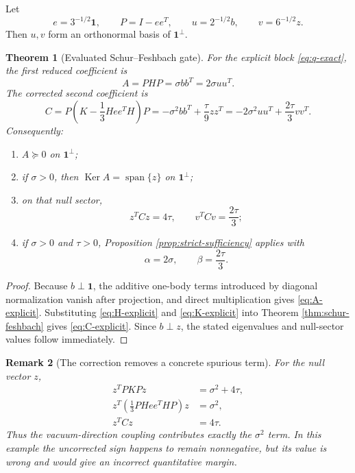\documentclass[11pt]{article}
\newtheorem{theorem}{Theorem}[section]
\newtheorem{remark}[theorem]{Remark}
\newcommand{\one}{\mathbf 1}
\newcommand{\Span}{\operatorname{span}}
\newcommand{\Ker}{\operatorname{Ker}}
\begin{document}
Let
\begin{equation}
  e=3^{-1/2}\one,
  \qquad
  P=I-ee^T,
  \qquad
  u=2^{-1/2}b,
  \qquad
  v=6^{-1/2}z.
  \label{eq:u-v}
\end{equation}
Then $u,v$ form an orthonormal basis of $\one^\perp$.

\begin{theorem}[Evaluated Schur--Feshbach gate]
\label{thm:evaluated-gate}
For the explicit block \eqref{eq:q-exact}, the first reduced coefficient is
\begin{equation}
  A=PHP=\sigma bb^T=2\sigma uu^T.
  \label{eq:A-explicit}
\end{equation}
The corrected second coefficient is
\begin{equation}
  C=P\left(K-\frac13Hee^TH\right)P
  =-\sigma^2bb^T+\frac{\tau}{9}zz^T
  =-2\sigma^2uu^T+\frac{2\tau}{3}vv^T.
  \label{eq:C-explicit}
\end{equation}
Consequently:
\begin{enumerate}[label=(\alph*)]
  \item $A\succeq0$ on $\one^\perp$;
  \item if $\sigma>0$, then $\Ker A=\Span\{z\}$ on $\one^\perp$;
  \item on that null sector,
  \begin{equation}
    z^TCz=4\tau,
    \qquad
    v^TCv=\frac{2\tau}{3};
    \label{eq:null-margin}
  \end{equation}
  \item if $\sigma>0$ and $\tau>0$, Proposition \ref{prop:strict-sufficiency} applies with
  \begin{equation}
    \alpha=2\sigma,
    \qquad
    \beta=\frac{2\tau}{3}.
    \label{eq:alpha-beta-margins}
  \end{equation}
\end{enumerate}
\end{theorem}

\begin{proof}
Because $b\perp\one$, the additive one-body terms introduced by diagonal normalization vanish after projection, and direct multiplication gives \eqref{eq:A-explicit}.  Substituting \eqref{eq:H-explicit} and \eqref{eq:K-explicit} into Theorem \ref{thm:schur-feshbach} gives \eqref{eq:C-explicit}.  Since $b\perp z$, the stated eigenvalues and null-sector values follow immediately.
\end{proof}

\begin{remark}[The correction removes a concrete spurious term]
For the null vector $z$,
\begin{align}
  z^TPKPz&=\sigma^2+4\tau,
  \label{eq:uncorrected-null}\\
  z^T\left(\frac13PHee^THP\right)z&=\sigma^2,
  \label{eq:correction-null}\\
  z^TCz&=4\tau.
  \label{eq:corrected-null}
\end{align}
Thus the vacuum-direction coupling contributes exactly the $\sigma^2$ term.  In this example the uncorrected sign happens to remain nonnegative, but its value is wrong and would give an incorrect quantitative margin.
\end{remark}
\end{document}
